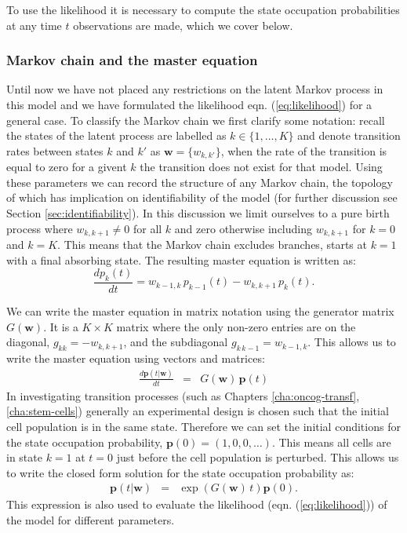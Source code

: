 To use the likelihood it is necessary to compute the state occupation probabilities at any time $t$ observations are made, which we cover below.

\subsubsection{Markov chain and the master equation}
\label{sec:markov-chain-master}

Until now we have not placed any restrictions on the latent Markov process in this model and we have formulated the
likelihood eqn. (\ref{eq:likelihood}) for a general case. To classify the Markov chain we first clarify some notation: recall the states of the latent process are labelled as $k \in \lbrace 1, \ldots, K \rbrace$ and denote transition rates between states $k$ and $k'$ as $\mathbf{w} = \lbrace w_{k,k'} \rbrace$, when the rate of the transition is equal to zero for a givent $k$ the transition does not exist for that model. Using these parameters we can record the structure of any Markov chain, the topology of which has implication on identifiability of the model (for further discussion see Section \ref{sec:identifiability}). In this discussion we limit ourselves to a pure birth process where $w_{k,k+1} \ne 0$ for all $k$ and zero otherwise including $w_{k, k+1}$ for $k=0$ and $k=K$. This means that the Markov chain excludes branches, starts at $k=1$ with a final absorbing state. The resulting master equation is written as:
\begin{equation}
  \label{eq:master}
  \frac{d p_k(t)}{dt} = w_{k-1,k}\, p_{k-1}(t) - w_{k,k+1}\, p_k(t).
\end{equation}

We can write the master equation in matrix notation using the generator matrix $G(\mathbf{w})$. It is a $K \times K$ matrix where the only non-zero entries are on the diagonal, $g_{kk}=-w_{k,k+1}$, and the subdiagonal $ g_{k\,k-1}=w_{k-1,k}$. This allows us to write the master equation using vectors and matrices:
\begin{eqnarray}
  \label{eq:masterMat}
 \frac{d  \mathbf{p}(t| \mathbf{w})}{dt} &=& G(\mathbf{w})\,\mathbf{p} (t)
\end{eqnarray}
In investigating transition processes (such as Chapters \ref{cha:oncog-transf}, \ref{cha:stem-cells}) generally an experimental design is chosen such that the initial cell population is in the same state. Therefore we can set the initial conditions for the state occupation probability, $\mathbf{p}(0) = (1, 0 , 0, \ldots)$. This means all cells are in state $k=1$ at $t=0$ just before the cell population is perturbed. This allows us to write the closed form solution for the state occupation probability as:
\begin{eqnarray}
  \label{eq:state-occ}
  \mathbf{p}(t| \mathbf{w}) &= & \exp{\left(G(\mathbf{w})\,t \right) } {\mathbf{p}}(0).
\end{eqnarray}
This expression is also used to evaluate the likelihood (eqn. (\ref{eq:likelihood})) of the model for different parameters.

